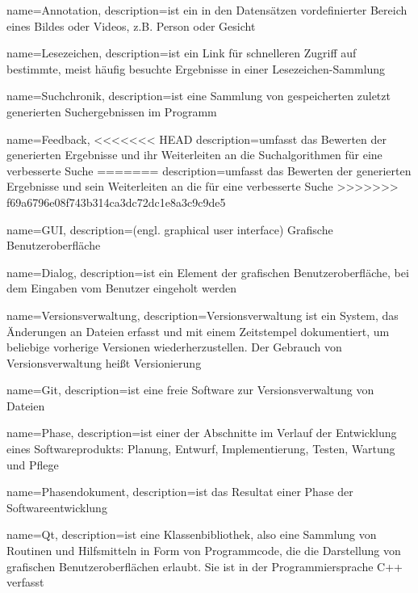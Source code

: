 {
name=Annotation,
description={ist ein in den Datensätzen vordefinierter Bereich eines Bildes oder Videos, z.B. Person oder Gesicht}
}

{
name=Lesezeichen,
description={ist ein Link für schnelleren Zugriff auf bestimmte, meist häufig besuchte Ergebnisse in einer Lesezeichen-Sammlung}
}

{
name=Suchchronik,
description={ist eine Sammlung von gespeicherten zuletzt generierten Suchergebnissen im Programm}
}

{
name=Feedback,
<<<<<<< HEAD
description={umfasst das Bewerten der generierten Ergebnisse und ihr Weiterleiten an die Suchalgorithmen für eine verbesserte Suche}
=======
description={umfasst das Bewerten der generierten Ergebnisse und sein Weiterleiten an die  für eine verbesserte Suche}
>>>>>>> f69a6796e08f743b314ca3dc72dc1e8a3c9c9de5
}

{
name=GUI,
description={(engl. graphical user interface) Grafische Benutzeroberfläche}
}

{
name=Dialog,
description={ist ein Element der grafischen Benutzeroberfläche, bei dem Eingaben vom Benutzer eingeholt werden}
}

{
name=Versionsverwaltung,
description={Versionsverwaltung ist ein System, das Änderungen an Dateien erfasst und mit einem Zeitstempel dokumentiert, um beliebige vorherige Versionen wiederherzustellen. Der Gebrauch von Versionsverwaltung heißt Versionierung}
}

{
name=Git,
description={ist eine freie Software zur \gls{Versionsverwaltung} von Dateien}
}

{
name=Phase,
description={ist einer der Abschnitte im Verlauf der Entwicklung eines Softwareprodukts: Planung, Entwurf, Implementierung, Testen, Wartung und Pflege}
}

{
name=Phasendokument,
description={ist das Resultat einer \gls{Phase} der Softwareentwicklung}
}

{
name=Qt,
description={ist eine Klassenbibliothek, also eine Sammlung von Routinen und Hilfsmitteln in Form von Programmcode, die die Darstellung von grafischen Benutzeroberflächen erlaubt. Sie ist in der Programmiersprache C++ verfasst}
}


